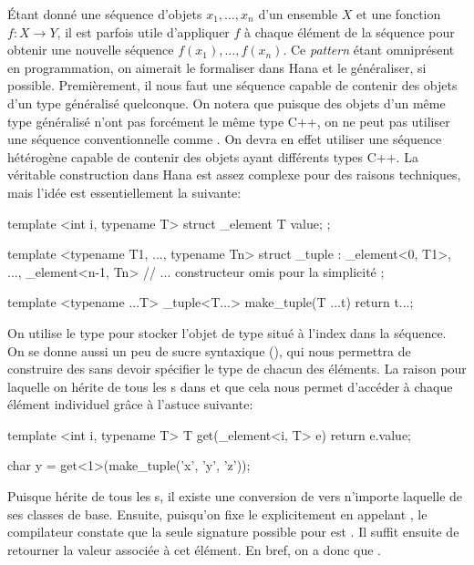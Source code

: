 Étant donné une séquence d'objets $x_1, \hdots, x_n$ d'un ensemble $X$ et une
fonction $f : X \to Y$, il est parfois utile d'appliquer $f$ à chaque élément
de la séquence pour obtenir une nouvelle séquence $f(x_1), \hdots, f(x_n)$.
Ce \textit{pattern} étant omniprésent en programmation, on aimerait le
formaliser dans Hana et le généraliser, si possible. Premièrement, il nous
faut une séquence capable de contenir des objets d'un type généralisé 
quelconque. On notera que puisque des objets d'un même type généralisé n'ont
pas forcément le même type C++, on ne peut pas utiliser une séquence
conventionnelle comme . On devra en effet utiliser une
séquence hétérogène capable de contenir des objets ayant différents types
C++. La véritable construction dans Hana est assez complexe pour des raisons
techniques, mais l'idée est essentiellement la suivante:
\begin{cpp}
    template <int i, typename T>
    struct _element { T value; };

    template <typename T1, ..., typename Tn>
    struct _tuple : _element<0, T1>, ..., _element<n-1, Tn> {
        // ... constructeur omis pour la simplicité
    };

    template <typename ...T>
    _tuple<T...> make_tuple(T ...t) {
        return {t...};
    }
\end{cpp}

On utilise le type  pour stocker l'objet de type 
situé à l'index  dans la séquence. On se donne aussi un peu de sucre
syntaxique (), qui nous permettra de construire des
 sans devoir spécifier le type de chacun des éléments.
La raison pour laquelle on hérite de tous les s dans
 et que cela nous permet d'accéder à chaque élément individuel
grâce à l'astuce suivante:
\begin{cpp}
    template <int i, typename T>
    T get(_element<i, T> e) {
        return e.value;
    }

    char y = get<1>(make_tuple('x', 'y', 'z'));
\end{cpp}

Puisque  hérite de tous les s, il existe une
conversion de  vers n'importe laquelle de ses classes de base.
Ensuite, puisqu'on fixe le  explicitement en appelant ,
le compilateur constate que la seule signature possible pour  est
. Il suffit ensuite de retourner la valeur
associée à cet élément. En bref, on a donc que
.

